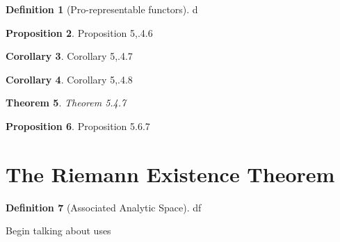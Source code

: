 \documentclass{article}
\newtheorem{theorem}{Theorem}[section]
\theoremstyle{definition}
\newtheorem{corollary}[theorem]{Corollary}
\newtheorem{proposition}[theorem]{Proposition}
\newtheorem{definition}[theorem]{Definition}
\theoremstyle{remark}
\begin{document}
\begin{definition}[Pro-representable functors]
	d
\end{definition}

\begin{proposition}
	Proposition 5,.4.6
\end{proposition}

\begin{corollary}
	Corollary 5,.4.7
\end{corollary}

\begin{corollary}
	Corollary 5,.4.8
\end{corollary}

\begin{theorem}
	Theorem 5.4.7
\end{theorem}

\begin{proposition}
	Proposition 5.6.7
\end{proposition}

\section{The Riemann Existence Theorem}

\begin{definition}[Associated Analytic Space]
	df
\end{definition}

Begin talking about uses



\end{document}
